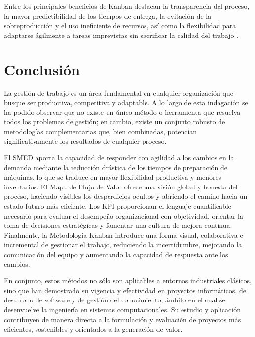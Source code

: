 \documentclass[12pt, letterpaper]{article}
\begin{document}
Entre los principales beneficios de Kanban destacan la transparencia del proceso, la mayor
predictibilidad de los tiempos de entrega, la evitación de la sobreproducción y el uso ineficiente
de recursos, así como la flexibilidad para adaptarse ágilmente a tareas imprevistas sin sacrificar
la calidad del trabajo \cite{apd2024}.

\section{Conclusión}

La gestión de trabajo es un área fundamental en cualquier organización que busque ser productiva,
competitiva y adaptable. A lo largo de esta indagación se ha podido observar que no existe un único
método o herramienta que resuelva todos los problemas de gestión; en cambio, existe un conjunto
robusto de metodologías complementarias que, bien combinadas, potencian significativamente los
resultados de cualquier proceso.

El SMED aporta la capacidad de responder con agilidad a los cambios en la demanda mediante la
reducción drástica de los tiempos de preparación de máquinas, lo que se traduce en mayor
flexibilidad productiva y menores inventarios. El Mapa de Flujo de Valor ofrece una visión global
y honesta del proceso, haciendo visibles los desperdicios ocultos y abriendo el camino hacia un
estado futuro más eficiente. Los KPI proporcionan el lenguaje cuantificable necesario para evaluar
el desempeño organizacional con objetividad, orientar la toma de decisiones estratégicas y fomentar
una cultura de mejora continua. Finalmente, la Metodología Kanban introduce una forma visual,
colaborativa e incremental de gestionar el trabajo, reduciendo la incertidumbre, mejorando la
comunicación del equipo y aumentando la capacidad de respuesta ante los cambios.

En conjunto, estos métodos no sólo son aplicables a entornos industriales clásicos, sino que han
demostrado su vigencia y efectividad en proyectos informáticos, de desarrollo de software y de
gestión del conocimiento, ámbito en el cual se desenvuelve la ingeniería en sistemas computacionales.
Su estudio y aplicación contribuyen de manera directa a la formulación y evaluación de proyectos
más eficientes, sostenibles y orientados a la generación de valor.

\newpage


\end{document}

